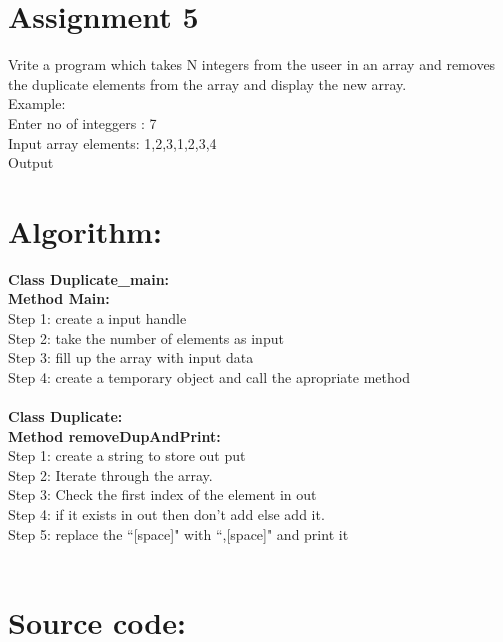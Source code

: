 \section*{\centering Assignment 5}
\vspace{15px}
Vrite a program which takes N integers from the useer in an array and removes the
duplicate elements from the array and display the new array.\\
Example:\\
Enter no of integgers : 7\\
Input array elements: 1,2,3,1,2,3,4\\

Output

\section*{Algorithm:}
\textbf{\color{javapurple}Class Duplicate\_main:}\\
\textbf{Method Main:}\\
Step 1: create a input handle \\
Step 2: take the number of elements as input \\
Step 3: fill up the array with input data \\
Step 4: create a temporary object and call the apropriate method \\\\
\textbf{\color{javapurple}Class Duplicate:}\\
\textbf{Method removeDupAndPrint:}\\
Step 1: create a string to store out put \\
Step 2: Iterate through the array. \\
Step 3: Check the first index of the element in out\\
Step 4: if it exists in out then don't add else add it.\\
Step 5: replace the ``[space]" with ``,[space]" and print it\\\\


\section*{Source code:}




